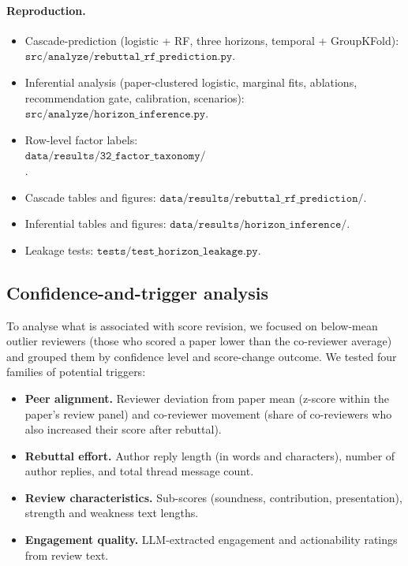 \documentclass{article}
\newcommand{\code}[1]{\texttt{#1}}
\begin{document}
\paragraph{Reproduction.}
\begin{itemize}[itemsep=0pt,topsep=2pt]
  \item Cascade-prediction (logistic + RF, three horizons, temporal + GroupKFold): $\code{src/analyze/rebuttal\_rf\_prediction.py}$.
  \item Inferential analysis (paper-clustered logistic, marginal fits, ablations, recommendation gate, calibration, scenarios): $\code{src/analyze/horizon\_inference.py}$.
  \item Row-level factor labels: $\code{data/results/32\_factor\_taxonomy/interaction\_factor\_labels\_\{2024,2025\}.csv}$.
  \item Cascade tables and figures: $\code{data/results/rebuttal\_rf\_prediction/}$.
  \item Inferential tables and figures: $\code{data/results/horizon\_inference/}$.
  \item Leakage tests: $\code{tests/test\_horizon\_leakage.py}$.
\end{itemize}

\subsection{Confidence-and-trigger analysis}\label{app:confidence-triggers}

To analyse what is associated with score revision, we focused on below-mean outlier reviewers (those who scored a paper lower than the co-reviewer average) and grouped them by confidence level and score-change outcome. We tested four families of potential triggers:
\begin{itemize}[itemsep=0pt,topsep=2pt]
  \item \textbf{Peer alignment.} Reviewer deviation from paper mean (z-score within the paper's review panel) and co-reviewer movement (share of co-reviewers who also increased their score after rebuttal).
  \item \textbf{Rebuttal effort.} Author reply length (in words and characters), number of author replies, and total thread message count.
  \item \textbf{Review characteristics.} Sub-scores (soundness, contribution, presentation), strength and weakness text lengths.
  \item \textbf{Engagement quality.} LLM-extracted engagement and actionability ratings from review text.
\end{itemize}
\end{document}
